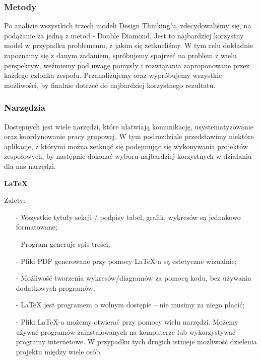 \documentclass[a4paper,titleauthor]{mwart}
\begin{document}
	\subsubsection{Metody}
	\label{sec:narzędzia}
	Po analizie wszystkich trzech modeli Design Thinking'u, zdecydowaliśmy się, na podążanie za jedną z metod - Double Diamond. Jest to najbardziej korzystny model w przypadku problememu, z jakim się zetkneliśmy. W tym celu dokładnie zapoznamy się z danym zadaniem, spróbujemy spojrzeć na problem z wielu perspektyw, weźmiemy pod uwagę pomysły i rozwiązania zaproponowane przez każdego członka zespołu. Przanalizujemy oraz wypróbujemy wszystkie możliwości, by finalnie dotrzeć do najbardziej korzystnego rezultatu. 
	
	\vspace{1cm}
	\subsubsection{Narzędzia}
	\label{sec:narzędzia}
	
	
	Dostępnych jest wiele narzędzi, które ułatwiają komunikację, usystematyzowanie oraz koordynowanie pracy grupowej. W tym podrozdziale przedstawimy niektóre aplikacje, z którymi można zetknąć się podejmując się wykonywania projektów zespołowych, by następnie dokonać wyboru najbardziej korzystnych w działaniu dla nas narzędzi. \newline \newline
	
	 \newline 
	
	\textbf{LaTeX} \newline
	\indent
	
	Zalety:
	\begin{itemize}
		
		\item[-]
		Wszystkie tytuły sekcji / podpisy tabel, grafik, wykresów są jednakowo formatowane;
		
		\item[-]
		Program generuje spis treści;
		
		\item[-]
		Pliki PDF generowane przy pomocy LaTeX-a są estetyczne wizualnie;
		
		\item[-]
		Możliwość tworzenia wykresów/diagramów za pomocą kodu, bez używania dodatkowych programów; 
		
		\item[-]
		LaTeX jest programem o wolnym dostępie – nie musimy za niego płacić;
		
		\item[-]
		Pliki LaTeX-a możemy otwierać przy pomocy wielu narzędzi. Możemy używać programów zainstalowanych na komputerze lub wykorzystywać programy internetowe. W przypadku tych drugich istnieje możliwość dzielenia projektu między wiele osób. 
	\end{itemize}
	
\end{document}
